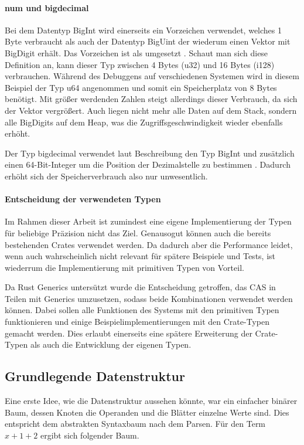 \documentclass[11pt,a4paper, ngerman]{article}
\begin{document}
\paragraph{num und bigdecimal} Bei dem Datentyp BigInt wird einerseits ein Vorzeichen verwendet, welches 1 Byte verbraucht \cite{EnumSize} als auch der Datentyp BigUint der wiederum einen Vektor mit BigDigit erhält. Das Vorzeichen ist als  umgesetzt \cite{BigIntSign}. Schaut man sich diese Definition an, kann dieser Typ zwischen 4 Bytes (u32) und 16 Bytes (i128) verbrauchen. Während des Debuggens auf verschiedenen Systemen wird in diesem Beispiel der Typ u64 angenommen und somit ein Speicherplatz von 8 Bytes benötigt. Mit größer werdenden Zahlen steigt allerdings dieser Verbrauch, da sich der Vektor vergrößert. Auch liegen nicht mehr alle Daten auf dem Stack, sondern alle BigDigits auf dem Heap, was die Zugriffsgeschwindigkeit wieder ebenfalls erhöht.

Der Typ bigdecimal verwendet laut Beschreibung den Typ BigInt und zusätzlich einen 64-Bit-Integer um die Position der Dezimalstelle zu bestimmen \cite{CrateBigdecimalDocs}. Dadurch erhöht sich der Speicherverbrauch also nur unwesentlich.

\paragraph{Entscheidung der verwendeten Typen} Im Rahmen dieser Arbeit ist zumindest eine eigene Implementierung der Typen für beliebige Präzision nicht das Ziel. Genausogut können auch die bereits bestehenden Crates verwendet werden. Da dadurch aber die Performance leidet, wenn auch wahrscheinlich nicht relevant für spätere Beispiele und Tests, ist wiederrum die Implementierung mit primitiven Typen von Vorteil.

Da Rust Generics untersützt wurde die Entscheidung getroffen, das CAS in Teilen mit Generics umzusetzen, sodass beide Kombinationen verwendet werden können. Dabei sollen alle Funktionen des Systems mit den primitiven Typen funktionieren und einige Beispielimplementierungen mit den Crate-Typen gemacht werden. Dies erlaubt einerseits eine spätere Erweiterung der Crate-Typen als auch die Entwicklung der eigenen Typen.

\subsection{Grundlegende Datenstruktur}
Eine erste Idee, wie die Datenstruktur aussehen könnte, war ein einfacher binärer Baum, dessen Knoten die Operanden und die Blätter einzelne Werte sind. Dies entspricht dem abstrakten Syntaxbaum nach dem Parsen. Für den Term $x+1+2$ ergibt sich folgender Baum.
\end{document}
